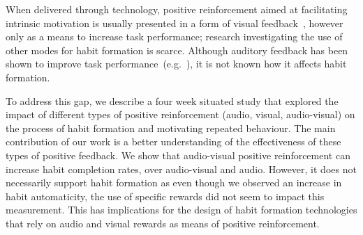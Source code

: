 \documentclass{scaffold/sigchi}
\begin{document}
When delivered through technology, positive reinforcement aimed at facilitating intrinsic motivation is usually presented in a form of visual feedback~\cite{comparison_of_auditory_visual_feedback, visual_mode_better, article_realtime_feedback_improving_medication_taking}, however only as a means to increase task performance; research investigating the use of other modes for habit formation is scarce. Although auditory feedback has been shown to improve task performance~(e.g.~\cite{burke2006comparing, vazquez2012auditory, chi_oussama_tap_the_shapetones}), it is not known how it affects habit formation.




To address this gap, we describe a four week situated study that explored the impact of different types of positive reinforcement (audio, visual, audio-visual) on the process of habit formation and motivating repeated behaviour. The main contribution of our work is a better understanding of the effectiveness of these types of positive feedback. We show that audio-visual positive reinforcement can increase habit completion rates, over audio-visual and audio. However, it does not necessarily support habit formation as even though we observed an increase in habit automaticity, the use of specific rewards did not seem to impact this measurement. This has implications for the design of habit formation technologies that rely on audio and visual rewards as means of positive reinforcement.
\end{document}
